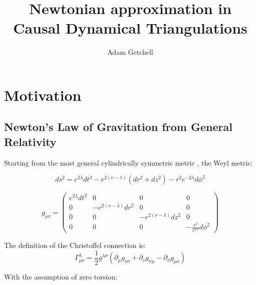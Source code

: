 \documentclass{article}
\title{Newtonian approximation in Causal Dynamical Triangulations}
\author{Adam Getchell}
\date{}
\begin{document}
\maketitle
\tableofcontents

\section{Motivation}

\subsection{Newton's Law of Gravitation from General Relativity}

Starting from the most general cylindrically symmetric metric \cite{synge_relativity}, the Weyl metric:

\begin{equation}
ds^{2}=e^{2\lambda}dt^{2}-e^{2\left(\nu-\lambda\right)}\left(dr^{2}+dz^{2}\right)-r^{2}e^{-2\lambda}d\phi^{2}
\end{equation}

\begin{equation}
g_{\mu\nu}=\left(\begin{array}{cccc}
e^{2\lambda}dt^{2} & 0 & 0 & 0\\
0 & -e^{2\left(\nu-\lambda\right)}dr^{2} & 0 & 0\\
0 & 0 & -e^{2\left(\nu-\lambda\right)}dz^{2} & 0\\
0 & 0 & 0 & -\frac{r^{2}}{e^{2\lambda}}d\phi^{2}
\end{array}\right)\label{eq:general-axisymmetric-static-matrix-metric}
\end{equation}

The definition of the Christoffel connection is: \cite{carroll2003spacetime} 
\begin{equation}
\Gamma_{\mu\nu}^{\lambda}=\frac{1}{2}g^{\lambda\sigma}\left(\partial_{\mu}g_{\nu\sigma}+\partial_{\nu}g_{\sigma\mu}-\partial_{\sigma}g_{\mu\nu}\right)
\end{equation}

With the assumption of zero torsion:
\end{document}
